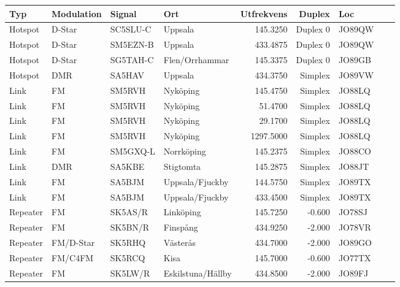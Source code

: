 \begin{longtable}{llllrrlcl}
	Typ      & Modulation & Signal   & Ort                    & Utfrekvens &   Duplex & Loc    &  &  \\ \hline
	Hotspot  & D-Star     & SC5SLU-C & Uppsala                &   145.3250 & Duplex 0 & JO89QW &  &  \\
	Hotspot  & D-Star     & SM5EZN-B & Uppsala                &   433.4875 & Duplex 0 & JO89QW &  &  \\
	Hotspot  & D-Star     & SG5TAH-C & Flen/Orrhammar         &   145.3375 & Duplex 0 & JO89GB &  &  \\
	Hotspot  & DMR        & SA5HAV   & Uppsala                &   434.3750 &  Simplex & JO89VW &  &  \\
	Link     & FM         & SM5RVH   & Nyköping               &   145.4750 &  Simplex & JO88LQ &  &  \\
	Link     & FM         & SM5RVH   & Nyköping               &    51.4700 &  Simplex & JO88LQ &  &  \\
	Link     & FM         & SM5RVH   & Nyköping               &    29.1700 &  Simplex & JO88LQ &  &  \\
	Link     & FM         & SM5RVH   & Nyköping               &  1297.5000 &  Simplex & JO88LQ &  &  \\
	Link     & FM         & SM5GXQ-L & Norrköping             &   145.2375 &  Simplex & JO88CO &  &  \\
	Link     & DMR        & SA5KBE   & Stigtomta              &   145.2875 &  Simplex & JO88JT &  &  \\
	Link     & FM         & SA5BJM   & Uppsala/Fjuckby        &   144.5750 &  Simplex & JO89TX &  &  \\
	Link     & FM         & SA5BJM   & Uppsala/Fjuckby        &   433.4500 &  Simplex & JO89TX &  &  \\
	Repeater & FM         & SK5AS/R  & Linköping              &   145.7250 &   -0.600 & JO78SJ &  &  \\
	Repeater & FM         & SK5BN/R  & Finspång               &   434.9250 &   -2.000 & JO78VR &  &  \\
	Repeater & FM/D-Star  & SK5RHQ   & Västerås               &   434.7000 &   -2.000 & JO89GO &  &  \\
	Repeater & FM/C4FM    & SK5RCQ   & Kisa                   &   145.7000 &   -0.600 & JO77TX &  &  \\
	Repeater & FM         & SK5LW/R  & Eskilstuna/Hällby      &   434.8500 &   -2.000 & JO89FJ &  &  \\

\end{longtable}
